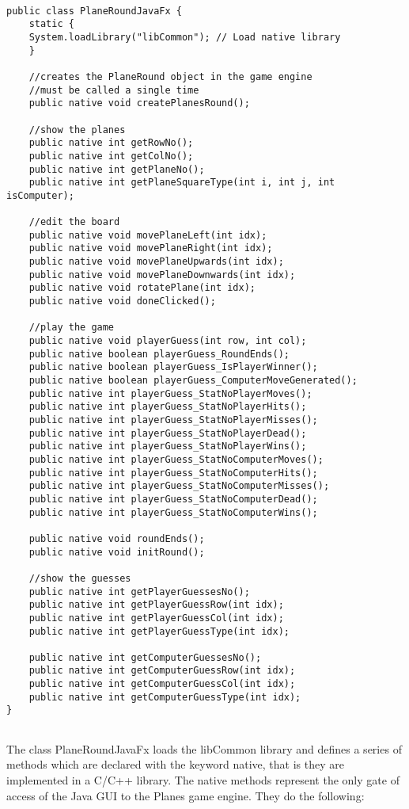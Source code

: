 \begin{lstlisting} 

public class PlaneRoundJavaFx {
	static {
	System.loadLibrary("libCommon"); // Load native library 
	}
	
	//creates the PlaneRound object in the game engine
	//must be called a single time	
	public native void createPlanesRound(); 
	
	//show the planes
	public native int getRowNo();
	public native int getColNo();
	public native int getPlaneNo();
	public native int getPlaneSquareType(int i, int j, int isComputer);
	
	//edit the board
	public native void movePlaneLeft(int idx);
	public native void movePlaneRight(int idx);
	public native void movePlaneUpwards(int idx);
	public native void movePlaneDownwards(int idx);
	public native void rotatePlane(int idx);
	public native void doneClicked();
	
	//play the game
	public native void playerGuess(int row, int col);
	public native boolean playerGuess_RoundEnds();
	public native boolean playerGuess_IsPlayerWinner();
	public native boolean playerGuess_ComputerMoveGenerated();
	public native int playerGuess_StatNoPlayerMoves();
	public native int playerGuess_StatNoPlayerHits();
	public native int playerGuess_StatNoPlayerMisses();
	public native int playerGuess_StatNoPlayerDead();
	public native int playerGuess_StatNoPlayerWins();
	public native int playerGuess_StatNoComputerMoves();
	public native int playerGuess_StatNoComputerHits();
	public native int playerGuess_StatNoComputerMisses();
	public native int playerGuess_StatNoComputerDead();
	public native int playerGuess_StatNoComputerWins();
	
	public native void roundEnds();
	public native void initRound();
	
	//show the guesses
	public native int getPlayerGuessesNo();
	public native int getPlayerGuessRow(int idx);
	public native int getPlayerGuessCol(int idx);
	public native int getPlayerGuessType(int idx);
	
	public native int getComputerGuessesNo();
	public native int getComputerGuessRow(int idx);
	public native int getComputerGuessCol(int idx);
	public native int getComputerGuessType(int idx);	
}


\end{lstlisting}

The class PlaneRoundJavaFx loads the libCommon library and defines a series of methods which are declared with the keyword native, that is they are implemented in a C/C++ library. The native methods represent the only gate of access of the Java GUI to the Planes game engine. They do the following:

